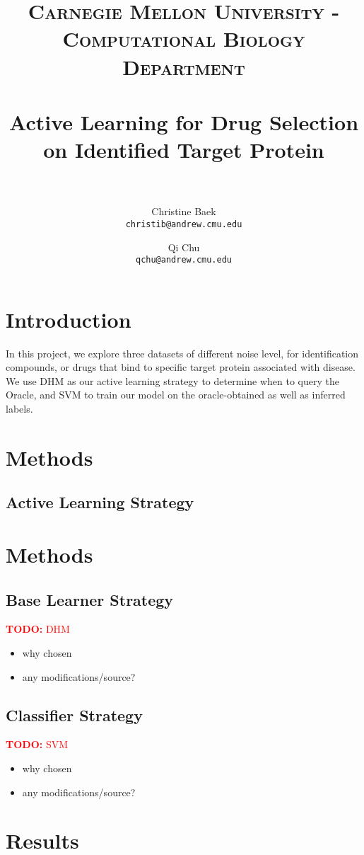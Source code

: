 \documentclass[paper=a4, fontsize=11pt]{scrartcl}
\title{
    \usefont{OT1}{bch}{b}{n}
    \normalfont \normalsize \textsc{Carnegie Mellon University - Computational Biology Department} \\ [25pt]
    \horrule{0.5pt} \\[0.4cm]
    \huge Active Learning for Drug Selection\\ on Identified Target Protein \\
    \horrule{2pt} \\[0.5cm]
}
\author{
  Christine Baek\\
  \normalsize\texttt{christib@andrew.cmu.edu}
  \and
  Qi Chu\\
  \normalsize\texttt{qchu@andrew.cmu.edu}
  \date{}
}
\date{}
\numberwithin{equation}{section}    %
\numberwithin{figure}{section}      %
\numberwithin{table}{section}       %
\newcommand{\TODO}[1]{\textcolor{red}{\textbf{TODO: } #1}}
\numberwithin{equation}{section}    %
\numberwithin{figure}{section}      %
\numberwithin{table}{section}       %
\begin{document}
\maketitle
\section{Introduction}
In this project, we explore three datasets of different noise level, for identification compounds, or drugs that bind to specific target protein associated with disease. We use DHM as our active learning strategy to determine when to query the Oracle, and SVM to train our model on the oracle-obtained as well as inferred labels. 


\section{Methods}

\subsection{Active Learning Strategy}



\section{Methods}

\subsection{Base Learner Strategy}


\TODO{DHM}
\begin{itemize}
\item why chosen
\item any modifications/source?
\end{itemize}

\subsection{Classifier Strategy}

\TODO{SVM}
\begin{itemize}
\item why chosen
\item any modifications/source?
\end{itemize}

\section{Results}
\end{document}
